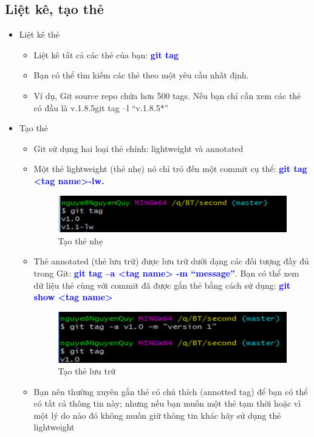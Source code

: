 \documentclass[12pt,a4paper]{report}
\begin{document}
\subsection{Liệt kê, tạo thẻ}
\begin{itemize}
\item Liệt kê thẻ
	\begin{itemize}
		\item Liệt kê tất cả các thẻ của bạn: \textcolor{blue}{\bf git tag}
		\item Bạn có thể tìm kiếm các thẻ theo một yêu cầu nhất định. 
		\item Ví dụ, Git source repo chứa hơn 500 tags. Nếu bạn chỉ cần xem các thẻ có đầu là v.1.8.5git tag –l “v.1.8.5*”
	\end{itemize}
\item Tạo thẻ
	\begin{itemize}
		\item Git sử dụng hai loại thẻ chính: lightweight và annotated
		\item Một thẻ lightweight (thẻ nhẹ) nó chỉ trỏ đến một commit cụ thể: \textcolor{blue}{\bf git tag <tag name>-lw.}
		
		\begin{figure}[!ht]
	\centering
	\includegraphics[width=0.8\linewidth]{screenshot042}
\caption{Tạo thẻ nhẹ}
	\label{fig:screenshot042}
\end{figure}

		\item Thẻ annotated (thẻ lưu trữ) được lưu trữ dưới dạng các đối tượng đầy đủ trong Git: \textcolor{blue}{\bf git tag –a <tag name> -m “message”}. Bạn có thể xem dữ liệu thẻ cùng với commit đã được gắn thẻ bằng cách sử dụng: \textcolor{blue}{\bf git show <tag name>}

\begin{figure}[!ht]
	\centering
	\includegraphics[width=0.8\linewidth]{screenshot043}
\caption{Tạo thẻ lưu trữ}
	\label{fig:screenshot043}
\end{figure}

		\item Bạn nên thường xuyên gắn thẻ có chú thích (annotted tag) để bạn có thể có tất cả thông tin này; nhưng nếu bạn muốn một thẻ tạm thời hoặc vì một lý do nào đó không muốn giữ thông tin khác hãy sử dụng thẻ lightweight
\end{itemize}
\end{itemize}
\end{document}

